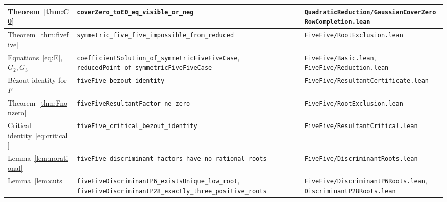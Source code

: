 \documentclass[10pt]{article}
\theoremstyle{definition}
\theoremstyle{remark}
\begin{document}
\begin{small}
\begin{longtable}{@{}p{3.6cm}p{6.3cm}p{5.4cm}@{}}
Theorem~\ref{thm:C0} & \texttt{cover\allowbreak Zero\_\allowbreak to\allowbreak E0\_\allowbreak eq\_\allowbreak visible\_\allowbreak or\_\allowbreak neg} & \texttt{Quadratic\allowbreak Reduction/\allowbreak Gaussian\allowbreak Cover\allowbreak Zero\allowbreak Row\allowbreak Completion.\allowbreak lean}\\
\midrule
Theorem~\ref{thm:fivefive} & \texttt{symmetric\_\allowbreak five\_\allowbreak five\_\allowbreak impossible\_\allowbreak from\_\allowbreak reduced} & \texttt{Five\allowbreak Five/\allowbreak Root\allowbreak Exclusion.\allowbreak lean}\\
Equations~\eqref{eq:E}, $G_2,G_3$ & \texttt{coefficient\allowbreak Solution\_\allowbreak of\_\allowbreak symmetric\allowbreak Five\allowbreak Five\allowbreak Case}, \texttt{reduced\allowbreak Point\_\allowbreak of\_\allowbreak symmetric\allowbreak Five\allowbreak Five\allowbreak Case} & \texttt{Five\allowbreak Five/\allowbreak Basic.\allowbreak lean}, \texttt{Five\allowbreak Five/\allowbreak Reduction.\allowbreak lean}\\
B\'ezout identity for $F$ & \texttt{five\allowbreak Five\_\allowbreak bezout\_\allowbreak identity} & \texttt{Five\allowbreak Five/\allowbreak Resultant\allowbreak Certificate.\allowbreak lean}\\
Theorem~\ref{thm:Fnonzero} & \texttt{five\allowbreak Five\allowbreak Resultant\allowbreak Factor\_\allowbreak ne\_\allowbreak zero} & \texttt{Five\allowbreak Five/\allowbreak Root\allowbreak Exclusion.\allowbreak lean}\\
Critical identity~\eqref{eq:critical} & \texttt{five\allowbreak Five\_\allowbreak critical\_\allowbreak bezout\_\allowbreak identity} & \texttt{Five\allowbreak Five/\allowbreak Resultant\allowbreak Critical.\allowbreak lean}\\
Lemma~\ref{lem:norational} & \texttt{five\allowbreak Five\_\allowbreak discriminant\_\allowbreak factors\_\allowbreak have\_\allowbreak no\_\allowbreak rational\_\allowbreak roots} & \texttt{Five\allowbreak Five/\allowbreak Discriminant\allowbreak Roots.\allowbreak lean}\\
Lemma~\ref{lem:cuts} & \texttt{five\allowbreak Five\allowbreak Discriminant\allowbreak P6\_\allowbreak exists\allowbreak Unique\_\allowbreak low\_\allowbreak root}, \texttt{five\allowbreak Five\allowbreak Discriminant\allowbreak P28\_\allowbreak exactly\_\allowbreak three\_\allowbreak positive\_\allowbreak roots} & \texttt{Five\allowbreak Five/\allowbreak Discriminant\allowbreak P6\allowbreak Roots.\allowbreak lean}, \texttt{Discriminant\allowbreak P28\allowbreak Roots.\allowbreak lean}\\

\end{longtable}
\end{small}
\end{document}
